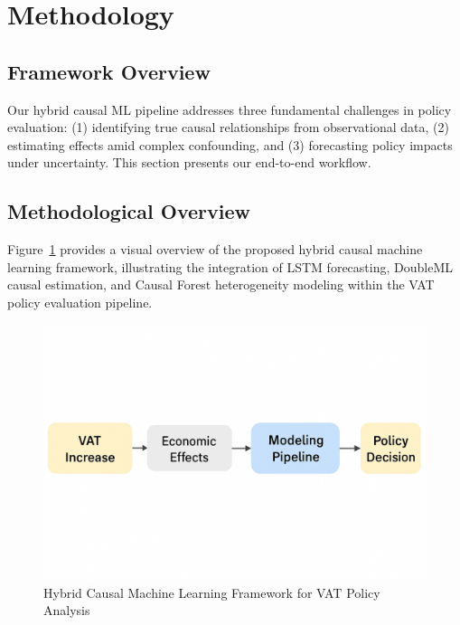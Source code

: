 \section{Methodology}\label{sec:methods}

\subsection{Framework Overview}\label{subsec:framework}

Our hybrid causal ML pipeline addresses three fundamental challenges in policy evaluation: (1) identifying true causal relationships from observational data, (2) estimating effects amid complex confounding, and (3) forecasting policy impacts under uncertainty. This section presents our end-to-end workflow.

\subsection{Methodological Overview}\label{subsec:methodology_overview}

Figure~\ref{fig:modelplan} provides a visual overview of the proposed hybrid causal machine learning framework, illustrating the integration of LSTM forecasting, DoubleML causal estimation, and Causal Forest heterogeneity modeling within the VAT policy evaluation pipeline.

\begin{figure}[htbp]
    \centering
    \includegraphics[width=\textwidth]{images/modelplan.png}
    \caption{Hybrid Causal Machine Learning Framework for VAT Policy Analysis}
    \label{fig:modelplan}
\end{figure}



